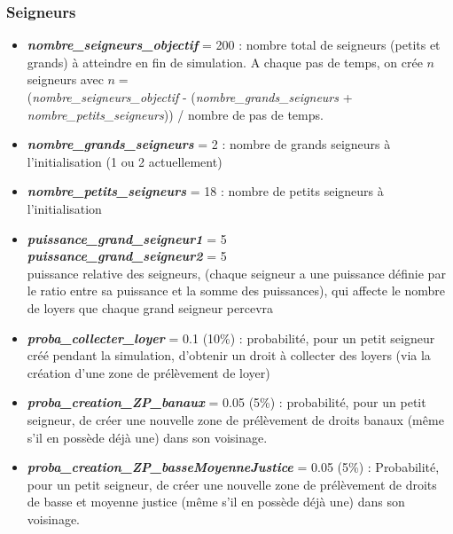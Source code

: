 \documentclass[a4paper,11pt]{article}
\begin{document}
{\begin{itemize}
\end{itemize}

\subsubsection{Seigneurs}
\begin{itemize}
	\item \textbf{\textit{nombre\_seigneurs\_objectif}} = 200 : nombre total de seigneurs (petits et grands) à atteindre en fin de simulation. A chaque pas de temps, on crée $n$ seigneurs avec $n = $\\
	(\textit{nombre\_seigneurs\_objectif} - (\textit{nombre\_grands\_seigneurs} +\\ \textit{nombre\_petits\_seigneurs})) / nombre de pas de temps.
	
	\item \textbf{\textit{nombre\_grands\_seigneurs}} = 2 : nombre de grands seigneurs à l'initialisation (1 ou 2 actuellement)
	
	\item \textbf{\textit{nombre\_petits\_seigneurs}} = 18 : nombre de petits seigneurs à l'initialisation
	
	\item \textbf{\textit{puissance\_grand\_seigneur1}} = 5\\ \textbf{\textit{puissance\_grand\_seigneur2}} = 5\\
	puissance relative des seigneurs, (chaque seigneur a une puissance définie par le ratio entre sa puissance et la somme des puissances), qui affecte le nombre de loyers que chaque grand seigneur percevra
	
	\item \textbf{\textit{proba\_collecter\_loyer}} = 0.1 (10\%) : probabilité, pour un petit seigneur créé pendant la simulation, d'obtenir un droit à collecter des loyers (via la création d'une zone de prélèvement de loyer)
	
	\item \textbf{\textit{proba\_creation\_ZP\_banaux}} = 0.05 (5\%) : probabilité, pour un petit seigneur, de créer une nouvelle zone de prélèvement de droits banaux (même s'il en possède déjà une) dans son voisinage.
	
	\item \textbf{\textit{proba\_creation\_ZP\_basseMoyenneJustice}} = 0.05 (5\%) : Probabilité, pour un petit seigneur, de créer une nouvelle zone de prélèvement de droits de basse et moyenne justice (même s'il en possède déjà une) dans son voisinage.
\end{itemize}

}
\end{document}
